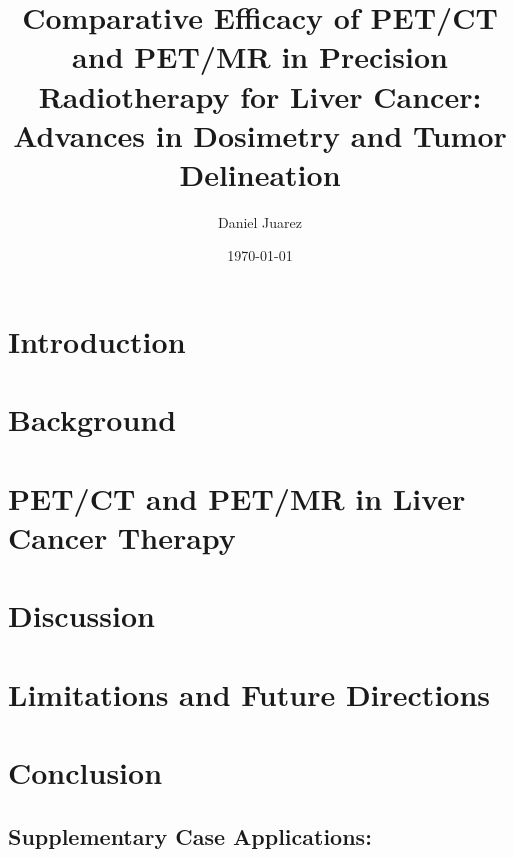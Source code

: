 \documentclass[11pt]{article} %
\title{Comparative Efficacy of PET/CT and PET/MR in Precision Radiotherapy for Liver Cancer: Advances in Dosimetry and Tumor Delineation}
\author{Daniel Juarez}
\date{\today}
\begin{document}
\maketitle

\begin{multicols}{2}


\section{Introduction}


\section{Background}


\end{multicols}

\section{PET/CT and PET/MR in Liver Cancer Therapy}


\begin{multicols}{2}


\section{Discussion}


\section{Limitations and Future Directions}


\section{Conclusion}


\end{multicols}

\newpage

\begin{appendices}
	
\begin{multicols}{2}	
	\section{Supplementary Case Applications: }
	
	
\end{multicols}	

\end{appendices}



\end{document}
